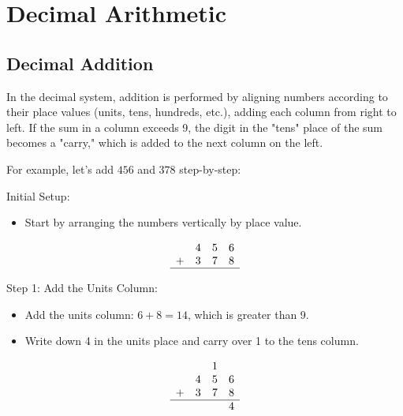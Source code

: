 \section{Decimal Arithmetic}

\subsection{Decimal Addition}
In the decimal system, addition is performed by aligning numbers according to their place values (units, tens, hundreds, etc.), adding each column from right to left. If the sum in a column exceeds 9, the digit in the "tens" place of the sum becomes a "carry," which is added to the next column on the left.
\vspace{\baselineskip}\par
For example, let's add \( 456 \) and \( 378 \) step-by-step:
\vspace{\baselineskip}\par
Initial Setup:
  \begin{itemize}
       \item  Start by arranging the numbers vertically by place value.
   \end{itemize}
\[
\begin{array}{cccc}
    & 4 & 5 & 6 \\
  + & 3 & 7 & 8 \\
  \hline
\end{array}
\]

\vspace{\baselineskip}\par
Step 1: Add the Units Column:
   \begin{itemize}
       \item Add the units column: \( 6 + 8 = 14 \), which is greater than 9.
       \item Write down 4 in the units place and carry over 1 to the tens column.
   \end{itemize}
\[
\begin{array}{cccc}
    & & 1 & \\ %
    & 4 & 5 & 6 \\
  + & 3 & 7 & 8 \\
  \hline
    & & & 4 \\
\end{array}
\]

